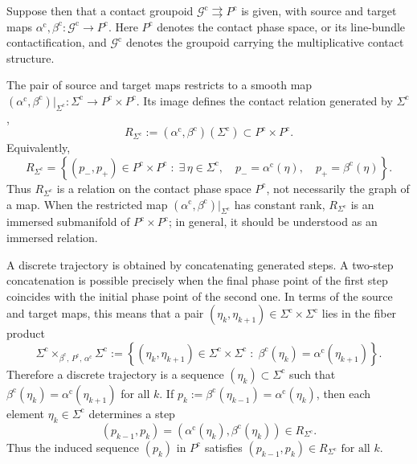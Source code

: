 \documentclass[11pt]{article}
\begin{document}
Suppose then that a contact groupoid
$\mathcal G^{\mathrm c}\rightrightarrows P^{\mathrm c}$
is given, with source and target maps
$\alpha^{\mathrm c},\beta^{\mathrm c}:
\mathcal G^{\mathrm c}\longrightarrow P^{\mathrm c}$.
Here \(P^{\mathrm c}\) denotes the contact phase space, or its line-bundle
contactification, and \(\mathcal G^{\mathrm c}\) denotes the groupoid carrying
the multiplicative contact structure.

The pair of source and target maps restricts to a smooth map
$(\alpha^{\mathrm c},\beta^{\mathrm c})|_{\Sigma^{\mathrm c}}:
\Sigma^{\mathrm c}\rightarrow P^{\mathrm c}\times P^{\mathrm c}$. Its image defines the contact relation generated by
\(\Sigma^{\mathrm c}\),
\[
R_{\Sigma^{\mathrm c}}
:=
(\alpha^{\mathrm c},\beta^{\mathrm c})(\Sigma^{\mathrm c})
\subset P^{\mathrm c}\times P^{\mathrm c}.
\]
Equivalently,
\begin{equation}\label{RS}
R_{\Sigma^{\mathrm c}}
=
\left\{
(p_-,p_+)\in P^{\mathrm c}\times P^{\mathrm c}
\;:\;
\exists\,\eta\in\Sigma^{\mathrm c},\quad
p_-=\alpha^{\mathrm c}(\eta),\quad
p_+=\beta^{\mathrm c}(\eta)
\right\}.
\end{equation}
Thus \(R_{\Sigma^{\mathrm c}}\) is a relation on the contact phase space
\(P^{\mathrm c}\), not necessarily the graph of a map. When the restricted map
\((\alpha^{\mathrm c},\beta^{\mathrm c})|_{\Sigma^{\mathrm c}}\) has constant
rank, \(R_{\Sigma^{\mathrm c}}\) is an immersed submanifold of
\(P^{\mathrm c}\times P^{\mathrm c}\); in general, it should be understood as
an immersed relation.

A discrete trajectory is obtained by concatenating generated steps. A two-step
concatenation is possible precisely when the final phase point of the first
step coincides with the initial phase point of the second one. In terms of the
source and target maps, this means that a pair
\((\eta_k,\eta_{k+1})\in\Sigma^{\mathrm c}\times\Sigma^{\mathrm c}\) lies in
the fiber product
\[
\Sigma^{\mathrm c}
\times_{\beta^{\mathrm c},\,P^{\mathrm c},\,\alpha^{\mathrm c}}
\Sigma^{\mathrm c}
:=
\left\{
(\eta_k,\eta_{k+1})\in\Sigma^{\mathrm c}\times\Sigma^{\mathrm c}
\;:\;
\beta^{\mathrm c}(\eta_k)=\alpha^{\mathrm c}(\eta_{k+1})
\right\}.
\]
Therefore a discrete trajectory is a sequence
\((\eta_k)\subset\Sigma^{\mathrm c}\) such that $\beta^{\mathrm c}(\eta_k)=\alpha^{\mathrm c}(\eta_{k+1})$ for all \(k\). If $p_k
:=
\beta^{\mathrm c}(\eta_{k-1})
=
\alpha^{\mathrm c}(\eta_k)$, then each element \(\eta_k\in\Sigma^{\mathrm c}\) determines a step
\[
(p_{k-1},p_k)
=
\left(
\alpha^{\mathrm c}(\eta_k),
\beta^{\mathrm c}(\eta_k)
\right)
\in R_{\Sigma^{\mathrm c}}.
\]
Thus the induced sequence \((p_k)\) in \(P^{\mathrm c}\) satisfies $(p_{k-1},p_k)\in R_{\Sigma^{\mathrm c}}\text{ for all } k$.
\end{document}
